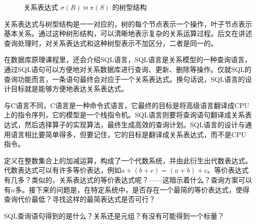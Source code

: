 \begin{figure}[H]
    \centering
    \caption{关系表达式 $\sigma(R) \bowtie \pi(S)$ 的树型结构}\label{fig:1-relation-tree}
\end{figure}

关系表达式与树型结构是一一对应的，树的每个节点表示一个操作，叶子节点表示基本关系。通过这种树形结构，可以清晰地表示复杂的关系运算过程。后文在讲述查询处理时，对关系表达式和这种树型表示不加区分，二者是同一的。

在数据库原理课程里\cite{Ullman1998A}，还会介绍SQL语言，SQL语言是关系模型的一种查询语言，通过SQL语句可以方便地对关系数据库进行查询、更新、删除等操作。仅就SQL的查询功能而言，一条语句最终会对应于一个关系表达式。换句话说，SQL语言的设计目标就是能够方便地表达关系表达式。

与C语言不同，C语言是一种命令式语言，它最终的目标是将高级语言翻译成CPU上的指令序列，它的模型是一个栈指令机。SQL语言则要将查询语句翻译成关系表达式，然后选择算子的实现算法，最终生成高效的查询计划。SQL语言的设计与通用语言相比要简单得多，但要记住，它的目标是翻译成关系表达式，而不是CPU指令。

\begin{exercise}
    定义在整数集合上的加减运算，构成了一个代数系统，并由此衍生出代数表达式。代数表达式可以有许多等价表达，例如$a+(b+c)=(a+b)+c$。等价表达式有几多？类似的，关系表达式的等价表达式呢？——这暗示着什么？查询方案可以有$n$多。接下来的问题是，在特定系统中，是否存在一个最简的等价表达式，使得查询代价最低？寻找这样的最简表达式是否可行？
\end{exercise}
\begin{exercise}
    SQL查询语句得到的是什么？关系还是元组？有没有可能得到一个标量？
\end{exercise}

